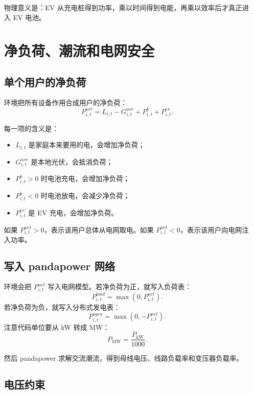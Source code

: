 \documentclass[UTF8,zihao=-4]{ctexart}
\begin{document}
物理意义是：EV 从充电桩得到功率，乘以时间得到电能，再乘以效率后才真正进入 EV 电池。

\section{净负荷、潮流和电网安全}

\subsection{单个用户的净负荷}

环境把所有设备作用合成用户的净负荷：
\begin{equation}
P^{net}_{i,t}
=L_{i,t}-G^{use}_{i,t}+P^b_{i,t}+P^{ev}_{i,t}.
\end{equation}

每一项的含义是：
\begin{itemize}
  \item $L_{i,t}$ 是家庭本来要用的电，会增加净负荷；
  \item $G^{use}_{i,t}$ 是本地光伏，会抵消负荷；
  \item $P^b_{i,t}>0$ 时电池充电，会增加净负荷；
  \item $P^b_{i,t}<0$ 时电池放电，会减少净负荷；
  \item $P^{ev}_{i,t}$ 是 EV 充电，会增加净负荷。
\end{itemize}

如果 $P^{net}_{i,t}>0$，表示该用户总体从电网取电。如果 $P^{net}_{i,t}<0$，表示该用户向电网注入功率。

\subsection{写入 pandapower 网络}

环境会把 $P^{net}_{i,t}$ 写入电网模型。若净负荷为正，就写入负荷表：
\begin{equation}
P^{load}_{i,t}=\max(0,P^{net}_{i,t}).
\end{equation}
若净负荷为负，就写入分布式发电表：
\begin{equation}
P^{sgen}_{i,t}=\max(0,-P^{net}_{i,t}).
\end{equation}
注意代码单位要从 kW 转成 MW：
\begin{equation}
P_{\mathrm{MW}}=\frac{P_{\mathrm{kW}}}{1000}.
\end{equation}

然后 pandapower 求解交流潮流，得到母线电压、线路负载率和变压器负载率。

\subsection{电压约束}
\end{document}

